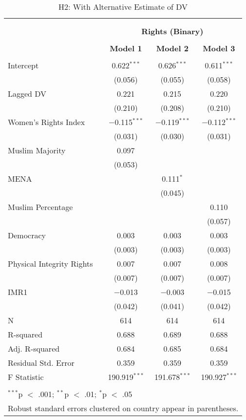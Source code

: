
\begin{table}[!htbp] \centering 
  \caption{H2: With Alternative Estimate of DV} 
  \label{} 
\begin{tabular}{@{\extracolsep{5pt}}lccc} 
\\[-1.8ex]\hline \\[-1.8ex] 
\\[-1.8ex] & \multicolumn{3}{c}{\textbf{Rights (Binary)}} \\ 
\\[-1.8ex] & \textbf{Model 1} & \textbf{Model 2} & \textbf{Model 3}\\ 
\hline \\[-1.8ex] 
 Intercept & 0.622$^{***}$ & 0.626$^{***}$ & 0.611$^{***}$ \\ 
  & (0.056) & (0.055) & (0.058) \\ 
  Lagged DV & 0.221 & 0.215 & 0.220 \\ 
  & (0.210) & (0.208) & (0.210) \\ 
  Women's Rights Index & $-$0.115$^{***}$ & $-$0.119$^{***}$ & $-$0.112$^{***}$ \\ 
  & (0.031) & (0.030) & (0.031) \\ 
  Muslim Majority & 0.097 &  &  \\ 
  & (0.053) &  &  \\ 
  MENA &  & 0.111$^{*}$ &  \\ 
  &  & (0.045) &  \\ 
  Muslim Percentage &  &  & 0.110 \\ 
  &  &  & (0.057) \\ 
  Democracy & 0.003 & 0.003 & 0.003 \\ 
  & (0.003) & (0.003) & (0.003) \\ 
  Physical Integrity Rights & 0.007 & 0.007 & 0.008 \\ 
  & (0.007) & (0.007) & (0.007) \\ 
  IMR1 & $-$0.013 & $-$0.003 & $-$0.015 \\ 
  & (0.042) & (0.041) & (0.042) \\ 
 N & 614 & 614 & 614 \\ 
R-squared & 0.688 & 0.689 & 0.688 \\ 
Adj. R-squared & 0.684 & 0.685 & 0.684 \\ 
Residual Std. Error & 0.359 & 0.359 & 0.359 \\ 
F Statistic & 190.919$^{***}$ & 191.678$^{***}$ & 190.927$^{***}$ \\ 
\hline \\[-1.8ex] 
\multicolumn{4}{l}{$^{***}$p $<$ .001; $^{**}$p $<$ .01; $^{*}$p $<$ .05} \\ 
\multicolumn{4}{l}{Robust standard errors clustered on country appear in parentheses.} \\ 
\end{tabular} 
\end{table} 
